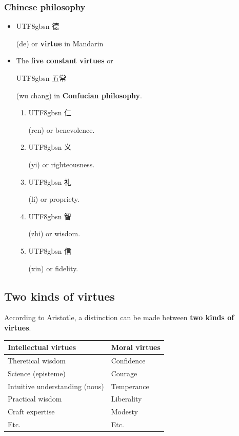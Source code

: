 \documentclass[11pt]{article}
\begin{document}
\subsubsection{Chinese philosophy}
\label{sec:org5a50d52}
\begin{itemize}
\item \begin{CJK*}{UTF8}{gbsn} 德 \end{CJK*} (de) or \textbf{virtue} in Mandarin
\item The \textbf{five constant virtues} or  \begin{CJK*}{UTF8}{gbsn} 五常 \end{CJK*} (wu chang) in \textbf{Confucian philosophy}.
\begin{enumerate}
\item \begin{CJK*}{UTF8}{gbsn} 仁 \end{CJK*} (ren) or benevolence.
\item \begin{CJK*}{UTF8}{gbsn} 义 \end{CJK*} (yi) or righteousness.
\item \begin{CJK*}{UTF8}{gbsn} 礼 \end{CJK*} (li) or propriety.
\item \begin{CJK*}{UTF8}{gbsn} 智 \end{CJK*} (zhi) or wisdom.
\item \begin{CJK*}{UTF8}{gbsn} 信 \end{CJK*} (xin) or fidelity.
\end{enumerate}
\end{itemize}
\subsection{Two kinds of virtues}
\label{sec:org89cd942}
According to Aristotle, a distinction can be made between \textbf{two kinds of virtues}.

\begin{center}
\begin{tabularx}{\textwidth}{X|X}
Intellectual virtues & Moral virtues\\
\hline
Theretical wisdom & Confidence\\
Science (episteme) & Courage\\
Intuitive understanding (nous) & Temperance\\
Practical wisdom & Liberality\\
Craft expertise & Modesty\\
Etc. & Etc.\\
\end{tabularx}
\end{center}
\end{document}
